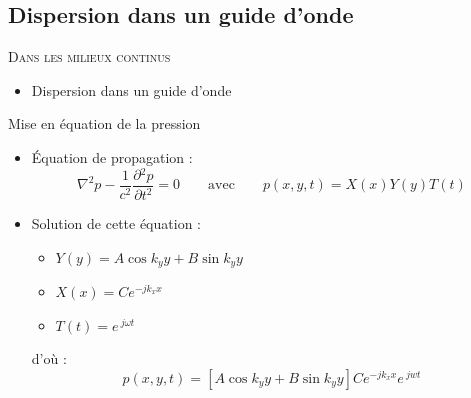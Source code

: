 \documentclass[xcolor=x11names,compress]{beamer}
\renewcommand{\(}{\begin{columns}}
\renewcommand{\)}{\end{columns}}
\newcommand{\<}[1]{\begin{column}{#1}}
\renewcommand{\>}{\end{column}}
\begin{document}
\subsection{Dispersion dans un guide d'onde}
\begin{frame}{}


{\scshape Dans les milieux continus}
\begin{itemize}
	\item[]Dispersion dans un guide d'onde
\end{itemize}
\end{frame}


\begin{frame}{Mise en équation de la pression}
	\begin{itemize}
		\item Équation de propagation : 
		\begin{equation*}
			\nabla^2p - \frac{1}{c^2}\frac{\partial{^2p}}{\partial{t}^2} = 0 \qquad \text{avec} \qquad p(x,y,t) = X(x)Y(y)T(t)
		\end{equation*}
		
		\item Solution de cette équation :
		\begin{itemize}
			\item $Y(y) = A\cos{k_yy}+B\sin{k_yy}$
			\item $X(x) = Ce^{-jk_xx}$
			\item $T(t) = e^{~j\omega t}$ 
		\end{itemize}
		\bigskip
		d'où : 
		\begin{equation}
			p(x,y,t) = [A\cos{k_yy}+B\sin{k_yy}]Ce^{-jk_xx} e^{~jwt}
		\end{equation}
	\end{itemize} 

\end{frame}

\end{document}

